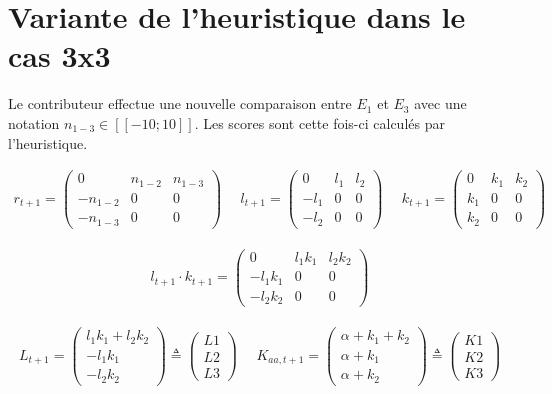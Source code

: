 \section{Variante de l'heuristique dans le cas 3x3}\label{appendice:calcul-theorique}

Le contributeur effectue une nouvelle comparaison entre $E_{1}$ et $E_{3}$ avec une notation $n_{1-3} \in [\![-10;10]\!]$. Les scores sont cette fois-ci calculés par l'heuristique.

\begin{align*}
r_{t+1}= \begin{pmatrix}
0 & n_{1-2} &  n_{1-3} \\
-n_{1-2} & 0 & 0\\
 -n_{1-3}  & 0 & 0
\end{pmatrix}
~~~~~~
l_{t+1}= \begin{pmatrix}
0 & l_1 & l_2\\
-l_1 & 0 & 0\\
-l_2 & 0 & 0
\end{pmatrix}
~~~~~~
k_{t+1}= \begin{pmatrix}
0 & k_1 &  k_2 \\
k_1 & 0 & 0 \\
 k_2 & 0 & 0
\end{pmatrix}
\end{align*}

\begin{align*}
l_{t+1} \cdot k_{t+1}= \begin{pmatrix}
0 & l_1 k_1 & l_2 k_2\\
-l_1 k_1 & 0 & 0\\
-l_2 k_2 & 0 & 0
\end{pmatrix}
\end{align*}

\begin{align*}
L_{t+1}= \begin{pmatrix}
l_1 k_1 +l_2 k_2 \\
-l_1 k_1\\
-l_2 k_2
\end{pmatrix} \triangleq
\begin{pmatrix}
L1\\
L2\\
L3
\end{pmatrix} 
~~~~~~
K_{aa,t+1}= \begin{pmatrix}
\alpha + k_1 + k_2\\
\alpha +  k_1 \\
\alpha + k_2
\end{pmatrix} \triangleq
\begin{pmatrix}
K1\\
K2\\
K3
\end{pmatrix} 
\end{align*}





